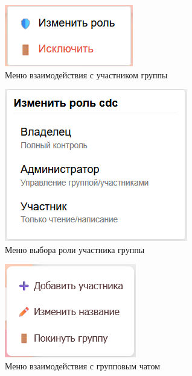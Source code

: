 \begin{figure}[h]
	\centering
	\includegraphics[width=0.8\linewidth]{"images/Меню взаимодействия с участником"}
	\caption{Меню взаимодействия с участником группы}
	\label{fig:member-menu}
\end{figure}

\begin{figure}[h]
	\centering
	\includegraphics[width=0.8\linewidth]{"images/Меню с ролями"}
	\caption{Меню выбора роли участника группы}
	\label{fig:role-dialog}
\end{figure}

\begin{figure}[h]
	\centering
	\includegraphics[width=0.8\linewidth]{"images/Меню взаимодействия с групповым чатом "}
	\caption{Меню взаимодействия с групповым чатом}
	\label{fig:menu-group}
\end{figure}

